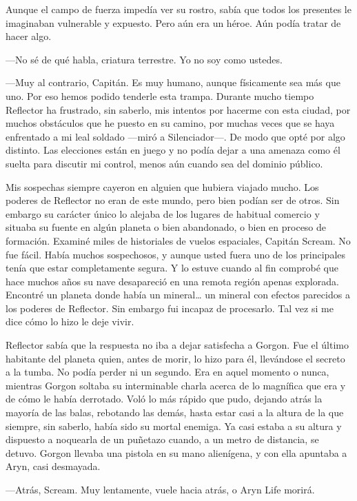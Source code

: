 Aunque el campo de fuerza impedía ver su rostro, sabía que todos los presentes le imaginaban vulnerable y expuesto. Pero aún era un héroe. Aún podía tratar de hacer algo.

---No sé de qué habla, criatura terrestre. Yo no soy como ustedes.

---Muy al contrario, Capitán. Es muy humano, aunque físicamente sea más que uno. Por eso hemos podido tenderle esta trampa. Durante mucho tiempo Reflector ha frustrado, sin saberlo, mis intentos por hacerme con esta ciudad, por muchos obstáculos que he puesto en su camino, por muchas veces que se haya enfrentado a mi leal soldado ---miró a Silenciador---. De modo que opté por algo distinto. Las elecciones están en juego y no podía dejar a una amenaza como él suelta para discutir mi control, menos aún cuando sea del dominio público.

\rquoti{}Mis sospechas siempre cayeron en alguien que hubiera viajado mucho. Los poderes de Reflector no eran de este mundo, pero bien podían ser de otros. Sin embargo su carácter único lo alejaba de los lugares de habitual comercio y situaba su fuente en algún planeta o bien abandonado, o bien en proceso de formación. Examiné miles de historiales de vuelos espaciales, Capitán Scream. No fue fácil. Había muchos sospechosos, y aunque usted fuera uno de los principales tenía que estar completamente segura. Y lo estuve cuando al fin comprobé que hace muchos años su nave desapareció en una remota región apenas explorada. Encontré un planeta donde había un mineral\dots{} un mineral con efectos parecidos a los poderes de Reflector. Sin embargo fui incapaz de procesarlo. Tal vez si me dice cómo lo hizo le deje vivir.

Reflector sabía que la respuesta no iba a dejar satisfecha a Gorgon. Fue el último habitante del planeta quien, antes de morir, lo hizo para él, llevándose el secreto a la tumba. No podía perder ni un segundo. Era en aquel momento o nunca, mientras Gorgon soltaba su interminable charla acerca de lo magnífica que era y de cómo le había derrotado. Voló lo más rápido que pudo, dejando atrás la mayoría de las balas, rebotando las demás, hasta estar casi a la altura de la que siempre, sin saberlo, había sido su mortal enemiga. Ya casi estaba a su altura y dispuesto a noquearla de un puñetazo cuando, a un metro de distancia, se detuvo. Gorgon llevaba una pistola en su mano alienígena, y con ella apuntaba a Aryn, casi desmayada.

---Atrás, Scream. Muy lentamente, vuele hacia atrás, o Aryn Life morirá.

